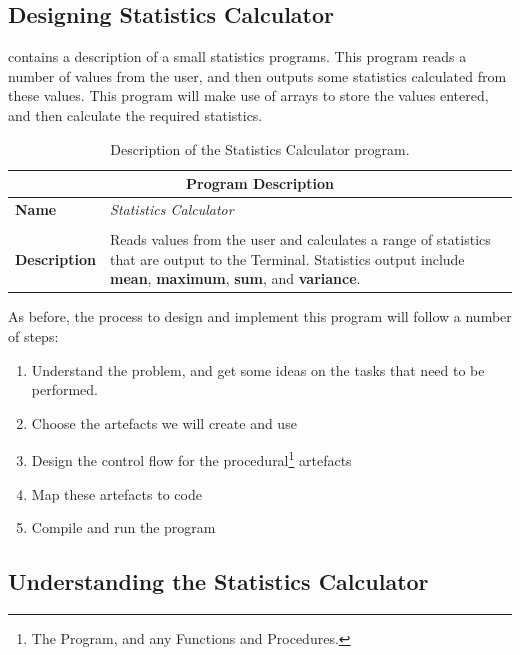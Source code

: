 \subsection{Designing Statistics Calculator} %
\label{sub:designing_statistics_calculator}

 contains a description of a small statistics programs. This program reads a number of values from the user, and then outputs some statistics calculated from these values. This program will make use of arrays to store the values entered, and then calculate the required statistics.

\begin{table}[h]
\centering
\begin{tabular}{l|p{10cm}}
  \hline
  \multicolumn{2}{c}{\textbf{Program Description}} \\
  \hline
  \textbf{Name} & \emph{Statistics Calculator} \\
  \\
  \textbf{Description} & Reads values from the user and calculates a range of statistics that are output to the Terminal. Statistics output include \textbf{mean}, \textbf{maximum}, \textbf{sum}, and \textbf{variance}.\\
  \hline
\end{tabular}
\caption{Description of the Statistics Calculator program.}
\label{tbl:stats-calc-prog}
\end{table}

As before, the process to design and implement this program will follow a number of steps:
\begin{enumerate}
  \item Understand the problem, and get some ideas on the tasks that need to be performed.
  \item Choose the artefacts we will create and use
  \item Design the control flow for the procedural\footnote{The Program, and any Functions and Procedures.} artefacts
  \item Map these artefacts to code
  \item Compile and run the program
\end{enumerate}


\subsection{Understanding the Statistics Calculator} %
\label{sub:understanding_the_statistics_calculator}

